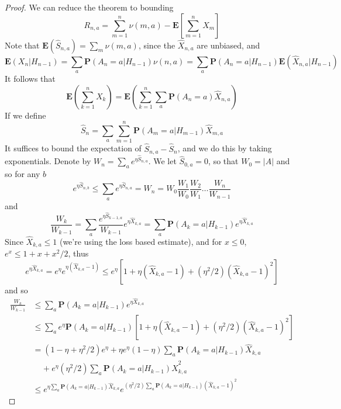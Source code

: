 \begin{proof}
    We can reduce the theorem to bounding
    \[ R_{n,a} = \sum_{m = 1}^n \nu(m,a) - \mathbf{E}\left[ \sum_{m = 1}^n X_m \right] \]
    Note that $\mathbf{E}(\widehat{S}_{n,a}) = \sum_m \nu(m,a)$, since the $\widehat{X}_{n,a}$ are unbiased, and
    \[ \mathbf{E}(X_n | H_{n-1}) = \sum_a \mathbf{P}(A_n = a| H_{n-1}) \nu(n,a) = \sum_a \mathbf{P}(A_n = a | H_{n-1}) \mathbf{E}(\widehat{X}_{n,a} | H_{n-1}) \]
    It follows that
    \[ \mathbf{E}\left(\sum_{k = 1}^n X_k\right) = \mathbf{E}\left(\sum_{k = 1}^n \sum_a \mathbf{P}(A_n = a) \widehat{X}_{n,a} \right) \]
    If we define
    \[ \widehat{S}_n = \sum_a \sum_{m=1}^n \mathbf{P}(A_m = a | H_{m-1}) \widehat{X}_{m,a} \]
    It suffices to bound the expectation of $\widehat{S}_{n,a} - \widehat{S}_n$, and we do this by taking exponentials. Denote by $W_n = \sum_a e^{\eta \widehat{S}_{n,a}}$. We let $\widehat{S}_{0,a} = 0$, so that $W_0 = |A|$ and so for any $b$
    \[ e^{\eta \widehat{S}_{n,b}} \leq \sum_a e^{\eta \widehat{S}_{n,a}} = W_n = W_0 \frac{W_1}{W_0} \frac{W_2}{W_1} \dots \frac{W_n}{W_{n-1}} \]
    and
    \[ \frac{W_k}{W_{k-1}} = \sum_a \frac{e^{\eta \widehat{S}_{k-1,a}}}{W_{k-1}} e^{\eta \widehat{X}_{k,a}} = \sum_a \mathbf{P}(A_k = a | H_{k-1}) e^{\eta \widehat{X}_{k,a}} \]
    Since $\widehat{X}_{k,a} \leq 1$ (we're using the loss based estimate), and for $x \leq 0$, $e^x \leq 1 + x + x^2/2$, thus
    \[ e^{\eta \widehat{X}_{k,a}} = e^{\eta} e^{\eta (\widehat{X}_{k,a} - 1)} \leq e^\eta \left[ 1 + \eta (\widehat{X}_{k,a} - 1) + (\eta^2/2) (\widehat{X}_{k,a} - 1)^2 \right] \]
    and so
    \begin{align*}
        \frac{W_k}{W_{k-1}} &\leq \sum_a \mathbf{P}(A_k = a | H_{k-1}) e^{\eta \widehat{X}_{k,a}}\\
        &\leq \sum_a e^\eta \mathbf{P}(A_k = a | H_{k-1}) \left[ 1 + \eta (\widehat{X}_{k,a} - 1) + (\eta^2/2) (\widehat{X}_{k,a} - 1)^2 \right]\\
        &= (1 - \eta + \eta^2/2)e^\eta + \eta e^\eta (1 - \eta) \sum_a \mathbf{P}(A_k = a | H_{k-1}) \widehat{X}_{k,a}\\
        &\ \ \ \ \ + e^\eta (\eta^2/2) \sum_a \mathbf{P}(A_k = a | H_{k-1}) \widehat{X}_{k,a}^2 \\
        &\leq e^{\eta \sum_a \mathbf{P}(A_k = a | H_{k-1}) \widehat{X}_{k,a}} e^{(\eta^2/2) \sum_a \mathbf{P}(A_k = a | H_{k-1}) (\widehat{X}_{k,a} - 1)^2}
    \end{align*}

\end{proof}
